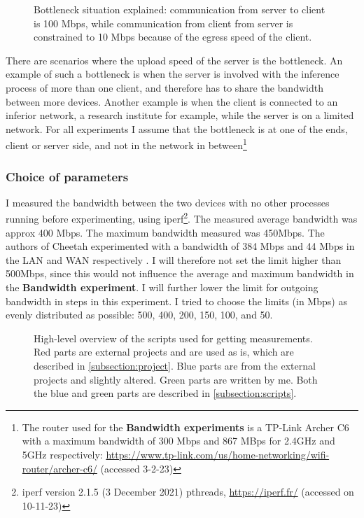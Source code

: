 \documentclass[../thesis.tex]{subfiles}
\begin{document}
\begin{figure}[hb]
    \centering
       
    \caption{Bottleneck situation explained: communication from server to client is 100 Mbps, while communication from client from server is constrained to 10 Mbps because of the egress speed of the client.}
    \label{fig:bottleneck}
\end{figure}

There are scenarios where the upload speed of the server is the bottleneck. An example of such a bottleneck is when the server is involved with the inference process of more than one client, and therefore has to share the bandwidth between more devices. Another example is when the client is connected to an inferior network, a research institute for example, while the server is on a limited network. For all experiments I assume that the bottleneck is at one of the ends, client or server side, and not in the network in between\footnote{The router used for the \textbf{Bandwidth experiments} is a TP-Link Archer C6 with a maximum bandwidth of 300 Mbps and 867 MBps for 2.4GHz and 5GHz respectively: \url{https://www.tp-link.com/us/home-networking/wifi-router/archer-c6/} (accessed 3-2-23)} 
\subsubsection{Choice of parameters}
I measured the bandwidth between the two devices with no other processes running before experimenting, using iperf\footnote{iperf version 2.1.5 (3 December 2021) pthreads, \url{https://iperf.fr/} (accessed on 10-11-23)}.  The measured average bandwidth was \color{red} approx 400 Mbps\color{black}. The maximum bandwidth measured was \color{red} 450Mbps\color{black}. The authors of Cheetah experimented with a bandwidth of 384 Mbps and 44 Mbps in the LAN and WAN respectively \parencite[p. 12]{cheetah}. I will therefore not set the limit higher than 500Mbps, since this would not influence the average and maximum bandwidth in the \textbf{Bandwidth experiment}. I will further lower the limit for outgoing bandwidth in steps in this experiment. I tried to choose the limits (in Mbps) as evenly distributed as possible: 500, 400, 200, 150, 100, and 50.

\begin{figure}[t]
    \centering
       
    \caption{High-level overview of the scripts used for getting measurements. \color{red}Red \color{black} parts are external projects and are used as is, which are described in \autoref{subsection:project}. \color{blue}Blue \color{black} parts are from the external projects and slightly altered. \color{green}Green \color{black} parts are written by me. Both the blue and green parts are described in \autoref{subsection:scripts}.}
    \label{fig:scripts}
\end{figure}
\end{document}
